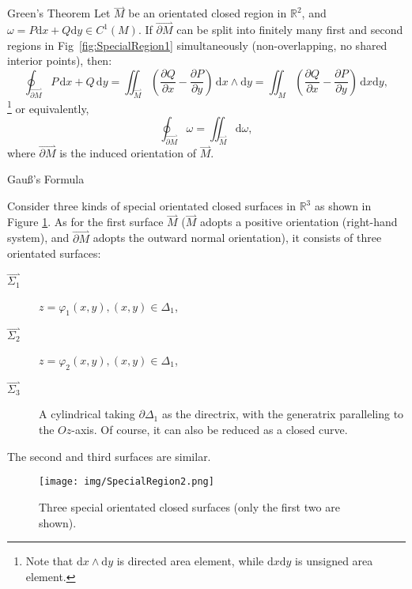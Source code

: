 \documentclass[11pt]{../../TexTemplate/elegantbook}
\begin{document}
\begin{theorem}{Green's Theorem}
    Let \(\overset{\rightharpoonup}{M}\) be an orientated closed region in \(\mathbb{R}^{2}\),
    and \(\omega = P\mathrm{d}x + Q \mathrm{d}y \in C^{1}(M)\).
    If \(\overset{\rightharpoonup}{\partial M}\) can be split into finitely many first and second regions 
    in Fig~\ref{fig:SpecialRegion1} simultaneously (non-overlapping, no shared interior points),
    then:
    \[
    \oint_{\overset{\rightharpoonup}{\partial M}} P \, \mathrm{d}x + Q \, \mathrm{d}y = 
    \iint_{\overset{\rightharpoonup}{M}} \left( \frac{\partial Q}{\partial x} - 
    \frac{\partial P}{\partial y} \right) \, \mathrm{d}x \wedge \mathrm{d}y =
        \iint_{M} \left( \frac{\partial Q}{\partial x} - 
    \frac{\partial P}{\partial y} \right) \, \mathrm{d}x \mathrm{d}y,
    \]\footnote{
        Note that \(\mathrm{d}x \wedge \mathrm{d}y \) is directed area element, 
        while \(\mathrm{d}x \mathrm{d}y\) is unsigned area element.
    }
    or equivalently,
    \[
    \oint_{\overset{\rightharpoonup}{\partial M}} \omega = \iint_{\overset{\rightharpoonup}{M}} \mathrm{d}\omega,
    \]
    where \(\overset{\rightharpoonup}{\partial M}\) is the induced orientation of \(\overset{\rightharpoonup}{M}\).
\end{theorem}


\begin{leftbarTitle}{Gauß's Formula}\end{leftbarTitle}
Consider three kinds of special orientated closed surfaces in \(\mathbb{R}^{3}\) as shown in Figure \ref{fig:SpecialRegion2}.
As for the first surface \(\overset{\rightharpoonup}{M}\)
($\overset{\rightharpoonup}{M}$ adopts a positive orientation (right-hand system), 
and $\overset{\rightharpoonup}{\partial M}$ adopts the outward normal orientation), 
it consists of three orientated surfaces:
\begin{description}
    \item[\(\overset{\rightharpoonup}{\Sigma_1}\)] \(z = \varphi_{1}(x, y), (x, y) \in \Delta_{1}\),
    \item[\(\overset{\rightharpoonup}{\Sigma_2}\)] \(z = \varphi_{2}(x, y), (x, y) \in \Delta_{1}\),
    \item[\(\overset{\rightharpoonup}{\Sigma_3}\)] A cylindrical taking \(\partial \Delta_1\) as the directrix,
        with the generatrix paralleling to the \(Oz\)-axis. 
        Of course, it can also be reduced as a closed curve.
\end{description}
The second and third surfaces are similar.
\begin{figure}[h]
    \centering
    \texttt{[image: img/SpecialRegion2.png]}
    \caption{Three special orientated closed surfaces (only the first two are shown).}
    \label{fig:SpecialRegion2}
\end{figure}
\end{document}

